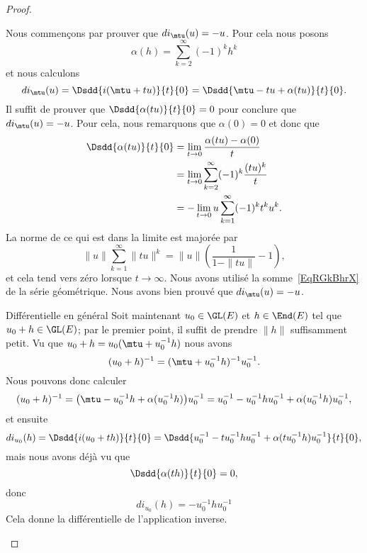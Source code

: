 \begin{proof}
\begin{subproof}
    Nous commençons par prouver que \( di_{\mtu}(u)=-u\). Pour cela nous posons
    \begin{equation}
        \alpha(h)=\sum_{k=2}^{\infty}(-1)^kh^k
    \end{equation}
    et nous calculons
    \begin{equation}
    di_{\mtu}(u)=\Dsdd{ i(\mtu+tu) }{t}{0}=\Dsdd{ \mtu-tu+\alpha(tu) }{t}{0}.
    \end{equation}
    Il suffit de prouver que \( \Dsdd{ \alpha(tu) }{t}{0}=0\) pour conclure que \( di_{\mtu}(u)=-u\). Pour cela, nous remarquons que \( \alpha(0)=0\) et donc que
    \begin{subequations}
        \begin{align}
        \Dsdd{ \alpha(tu) }{t}{0}&=\lim_{t\to 0} \frac{ \alpha(tu)-\alpha(0) }{ t }\\
        &=\lim_{t\to 0} \sum_{k=2}^{\infty}(-1)^k\frac{ (tu)^k }{ t }\\
        &=-\lim_{t\to 0} u\sum_{k=1}^{\infty}(-1)^kt^ku^k.
        \end{align}
    \end{subequations}
    La norme de ce qui est dans la limite est majorée par
    \begin{equation}
    \| u \|\sum_{k=1}^{\infty}\| tu \|^k=\| u \|\left( \frac{1}{ 1-\| tu \| }-1 \right),
    \end{equation}
    et cela tend vers zéro lorsque \( t\to\infty\). Nous avons utilisé la somme~\ref{EqRGkBhrX} de la série géométrique. Nous avons bien prouvé que \( di_{\mtu}(u)=-u\).

    \item[Différentielle en général]
    Soit maintenant \( u_0\in\GL(E)\) et \( h\in\End(E)\) tel que \( u_0+h\in \GL(E)\); par le premier point, il suffit de prendre \( \| h \|\) suffisamment petit. Vu que \( u_0+h=u_0(\mtu+u_0^{-1}h)\) nous avons
    \begin{equation}
        (u_0+h)^{-1}=(\mtu+u_0^{-1}h)^{-1}u_0^{-1}.
    \end{equation}
    Nous pouvons donc calculer
    \begin{equation}
        (u_0+h)^{-1}=\big( \mtu-u_0^{-1}h+\alpha(u_0^{-1}h) \big)u_0^{-1}=u_0^{-1}-u_0^{-1}hu_0^{-1}+\alpha(u_0^{-1}h)u_0^{-1},
    \end{equation}
    et ensuite
    \begin{equation}
        di_{u_0}(h)=\Dsdd{ i(u_0+th) }{t}{0}=\Dsdd{ u_0^{-1}-tu_0^{-1}hu_0^{-1}+\alpha(tu_0^{-1}h)u_0^{-1} }{t}{0},
    \end{equation}
    mais nous avons déjà vu que
    \begin{equation}
        \Dsdd{ \alpha(th) }{t}{0}=0,
    \end{equation}
    donc
    \begin{equation}
        di_{u_0}(h)=-u_0^{-1}hu_0^{-1}
    \end{equation}
    Cela donne la différentielle de l'application inverse.


\end{subproof}
\end{proof}
